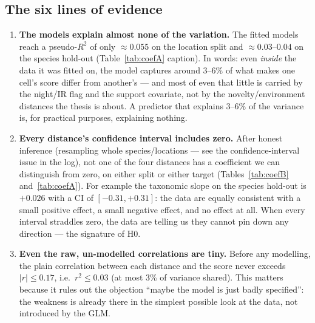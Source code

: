 \documentclass[11pt]{article}
\begin{document}
\subsection{The six lines of evidence}
\begin{enumerate}[leftmargin=1.6em,itemsep=6pt]
  \item \textbf{The models explain almost none of the variation.}
        The fitted models reach a pseudo-$R^2$ of only $\approx 0.055$ on the location split and
        $\approx 0.03$--$0.04$ on the species hold-out (Table~\ref{tab:coefA} caption). In words: even
        \emph{inside} the data it was fitted on, the model captures around 3--6\% of what makes one cell's
        score differ from another's --- and most of even that little is carried by the night/IR flag and
        the support covariate, not by the novelty/environment distances the thesis is about. A predictor
        that explains 3--6\% of the variance is, for practical purposes, explaining nothing.

  \item \textbf{Every distance's confidence interval includes zero.}
        After honest inference (resampling whole species/locations --- see the confidence-interval issue
        in the log), not one of the four distances has a coefficient we can distinguish from zero, on
        either split or either target (Tables~\ref{tab:coefB} and~\ref{tab:coefA}). For example the
        taxonomic slope on the species hold-out is $+0.026$ with a CI of $[-0.31, +0.31]$: the data are
        equally consistent with a small positive effect, a small negative effect, and no effect at all.
        When every interval straddles zero, the data are telling us they cannot pin down any direction ---
        the signature of H0.

  \item \textbf{Even the raw, un-modelled correlations are tiny.}
        Before any modelling, the plain correlation between each distance and the score never exceeds
        $|r| \le 0.17$, i.e.\ $r^2 \le 0.03$ (at most 3\% of variance shared). This matters because it
        rules out the objection ``maybe the model is just badly specified'': the weakness is already there
        in the simplest possible look at the data, not introduced by the GLM.


\end{enumerate}
\end{document}
